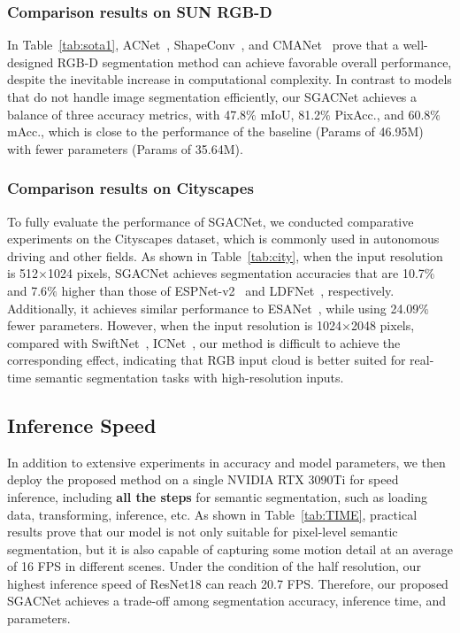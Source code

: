 \documentclass[journal,twoside,web]{ieeecolor}
\begin{document}
\subsubsection{Comparison results on SUN RGB-D}
In Table~\ref{tab:sota1}, ACNet~\cite{ACNet}, ShapeConv~\cite{ShapeConv}, and CMANet~\cite{CMANet} prove that a well-designed RGB-D segmentation method can achieve favorable overall performance, despite the inevitable increase in computational complexity. In contrast to models that do not handle image segmentation efficiently, our SGACNet achieves a balance of three accuracy metrics, with 47.8$\%$ mIoU, 81.2$\%$ PixAcc., and 60.8$\%$ mAcc., which is close to the performance of the baseline (Params of 46.95M)~\cite{ESANet} with fewer parameters (Params of 35.64M).

\subsubsection{Comparison results on Cityscapes}
To fully evaluate the performance of SGACNet, we conducted comparative experiments on the Cityscapes dataset, which is commonly used in autonomous driving and other fields. As shown in Table~\ref{tab:city}, when the input resolution is 512$\times$1024 pixels, SGACNet achieves segmentation accuracies that are 10.7$\%$ and 7.6$\%$ higher than those of ESPNet-v2~\cite{ESPNetv2} and LDFNet~\cite{LDFNet}, respectively. Additionally, it achieves similar performance to ESANet~\cite{ESANet}, while using 24.09$\%$ fewer parameters. However, when the input resolution is 1024$\times$2048 pixels, compared with SwiftNet~\cite{SwiftNet}, ICNet~\cite{ICNet}, our method is difficult to achieve the corresponding effect, indicating that RGB input cloud is better suited for real-time semantic segmentation tasks with high-resolution inputs. 

\subsection{Inference Speed}
In addition to extensive experiments in accuracy and model parameters, we then deploy the proposed method on a single NVIDIA RTX 3090Ti for speed inference, including \textbf{all the steps} for semantic segmentation, such as loading data, transforming, inference, etc. As shown in Table~\ref{tab:TIME}, practical results prove that our model is not only suitable for pixel-level semantic segmentation, but it is also capable of capturing some motion detail at an average of 16 FPS in different scenes. Under the condition of the half resolution, our highest inference speed of ResNet18 can reach 20.7 FPS. Therefore, our proposed SGACNet achieves a trade-off among segmentation accuracy, inference time, and parameters.
\end{document}
